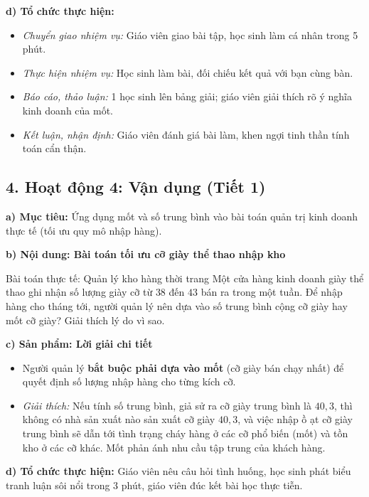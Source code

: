 \documentclass[12pt, a4paper]{article}
\begin{document}
\noindent \textbf{d) Tổ chức thực hiện:}
\begin{itemize}[leftmargin=0.8cm]
    \item \textit{Chuyển giao nhiệm vụ:} Giáo viên giao bài tập, học sinh làm cá nhân trong 5 phút.
    \item \textit{Thực hiện nhiệm vụ:} Học sinh làm bài, đối chiếu kết quả với bạn cùng bàn.
    \item \textit{Báo cáo, thảo luận:} 1 học sinh lên bảng giải; giáo viên giải thích rõ ý nghĩa kinh doanh của mốt.
    \item \textit{Kết luận, nhận định:} Giáo viên đánh giá bài làm, khen ngợi tinh thần tính toán cẩn thận.
\end{itemize}

\subsection*{4. Hoạt động 4: Vận dụng (Tiết 1)}

\noindent \textbf{a) Mục tiêu:}
Ứng dụng mốt và số trung bình vào bài toán quản trị kinh doanh thực tế (tối ưu quy mô nhập hàng).

\noindent \textbf{b) Nội dung: Bài toán tối ưu cỡ giày thể thao nhập kho}
\begin{pedabox}{Bài toán thực tế: Quản lý kho hàng thời trang}
Một cửa hàng kinh doanh giày thể thao ghi nhận số lượng giày cỡ từ $38$ đến $43$ bán ra trong một tuần. Để nhập hàng cho tháng tới, người quản lý nên dựa vào số trung bình cộng cỡ giày hay mốt cỡ giày? Giải thích lý do vì sao.
\end{pedabox}

\noindent \textbf{c) Sản phẩm: Lời giải chi tiết}
\begin{itemize}[leftmargin=0.6cm]
    \item Người quản lý \textbf{bắt buộc phải dựa vào mốt} (cỡ giày bán chạy nhất) để quyết định số lượng nhập hàng cho từng kích cỡ.
    \item \textit{Giải thích:} Nếu tính số trung bình, giả sử ra cỡ giày trung bình là $40{,}3$, thì không có nhà sản xuất nào sản xuất cỡ giày $40{,}3$, và việc nhập ồ ạt cỡ giày trung bình sẽ dẫn tới tình trạng cháy hàng ở các cỡ phổ biến (mốt) và tồn kho ở các cỡ khác. Mốt phản ánh nhu cầu tập trung của khách hàng.
\end{itemize}

\noindent \textbf{d) Tổ chức thực hiện:}
Giáo viên nêu câu hỏi tình huống, học sinh phát biểu tranh luận sôi nổi trong 3 phút, giáo viên đúc kết bài học thực tiễn.
\end{document}
